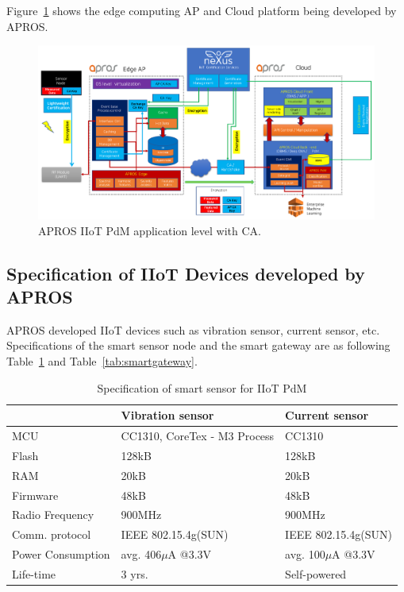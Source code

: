\documentclass[11pt]{article}
\begin{document}
Figure~\ref{fig:apros-pdm-with-ca} shows the edge computing AP and Cloud platform being developed by APROS.

\begin{figure}[!ht]
\centering
\includegraphics[width=1\textwidth]{apros-PdM-platform_ym.pdf}
\caption{APROS IIoT PdM application level with CA.}
\label{fig:apros-pdm-with-ca}
\end{figure}

\subsection{Specification of IIoT Devices developed by APROS}
APROS developed IIoT devices such as vibration sensor, current sensor, etc. Specifications of the smart sensor node and the smart gateway are as following Table~\ref{tab:smartsensor} and Table~\ref{tab:smartgateway}.

\begin{table}[]
\centering
\begin{tabular}{l|l|l}
\hline
&Vibration sensor&Current sensor\\ \hline
MCU&CC1310, CoreTex - M3 Process&CC1310\\ \hline
Flash& 128kB& 128kB\\ \hline
RAM& 20kB& 20kB\\ \hline
Firmware& 48kB& 48kB\\ \hline
Radio Frequency& 900MHz& 900MHz\\ \hline
Comm. protocol & IEEE 802.15.4g(SUN)& IEEE 802.15.4g(SUN)\\ \hline
Power Consumption& avg. 406$\mu$A @3.3V &avg. 100$\mu$A @3.3V\\ \hline
Life-time & 3 yrs.& Self-powered\\ \hline
\end{tabular}
\caption{Specification of smart sensor for IIoT PdM}
\label{tab:smartsensor}
\end{table}
\end{document}

